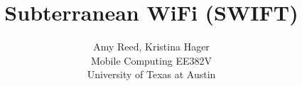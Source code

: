 \documentclass[10pt,twocolumn]{article}
\begin{document}
\title{Subterranean WiFi (SWIFT)}

\author{Amy Reed, Kristina Hager\\
Mobile Computing EE382V\\
University of Texas at Austin\\
\\
}

\maketitle
\thispagestyle{empty}

\end{document}

